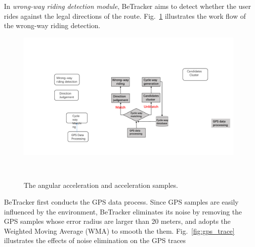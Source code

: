 \documentclass{sigchi-ext}
\def\sysname{BeTracker }
\begin{document}
In \textit{wrong-way riding detection module}, \sysname aims to detect whether the user rides against the legal directions of the route.
Fig.~\ref{fig:gps_workflow} illustrates the work flow of the wrong-way riding detection. 

\begin{figure}[h]
	\includegraphics[width=0.7\columnwidth]{figures/gps_workflow.pdf}
	\caption{The angular acceleration and acceleration samples.}~\label{fig:gps_workflow}
\end{figure}
%
\sysname first conducts the GPS data process. Since GPS samples are easily influenced by the environment, \sysname eliminates its noise by removing the GPS samples whose error radius are larger than 20 meters, and adopts the Weighted Moving Average (WMA) to smooth the them.  Fig.~\ref{fig:gps_trace} illustrates the effects of noise elimination on the GPS traces
\end{document}
